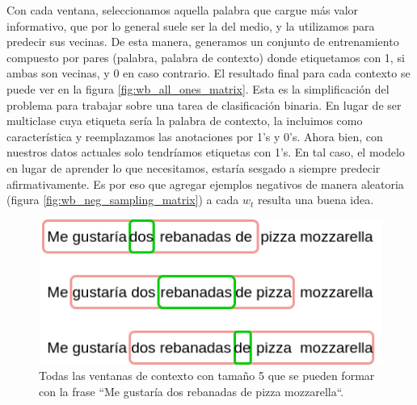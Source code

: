 Con cada ventana, seleccionamos aquella palabra que cargue más valor
informativo, que por lo general suele ser la del medio, y la utilizamos para
predecir sus vecinas. De esta manera, generamos un conjunto de entrenamiento
compuesto por pares (palabra, palabra de contexto) donde etiquetamos con 1, si
ambas son vecinas, y 0 en caso contrario. El resultado final para cada contexto
se puede ver en la figura \ref{fig:wb_all_ones_matrix}. Esta es la simplificación del problema para
trabajar sobre una tarea de clasificación binaria. En lugar de ser multiclase
cuya  etiqueta sería la palabra de contexto, la incluimos como característica y
reemplazamos las anotaciones por 1's y 0's. Ahora bien, con nuestros datos
actuales solo tendríamos etiquetas con 1's. En tal caso, el modelo en lugar de
aprender lo que necesitamos, estaría sesgado a siempre predecir afirmativamente.
Es por eso que agregar ejemplos negativos de manera aleatoria (figura \ref{fig:wb_neg_sampling_matrix}) a
cada $w_t$ resulta una buena idea.

\begin{figure}
    \centering
    \includegraphics[scale=0.60]{figures/context_example_1.png}
    \caption{Todas las ventanas de contexto con tamaño 5 que se pueden formar con la frase
             ``Me gustaría dos rebanadas de pizza mozzarella``.}
    \label{fig:wb_slices}
\end{figure}

